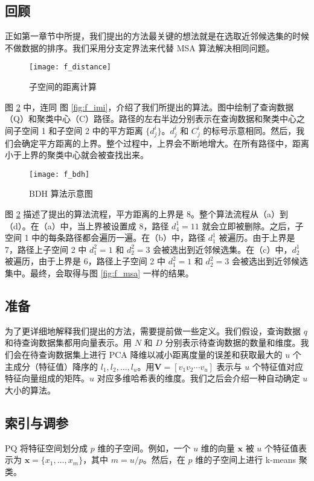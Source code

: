 \subsection{回顾}
正如第一章节中所提，我们提出的方法最关键的想法就是在选取近邻候选集的时候不做数据的排序。我们采用分支定界法来代替 MSA 算法解决相同问题。
\begin{figure}[H]
  \centering
  \texttt{[image: f\_distance]}
  \caption{子空间的距离计算}
  \label{fig:f_distance}
\end{figure}
图 \ref{fig:f_bdh} 中，连同 图 \ref{fig:f_imi}，介绍了我们所提出的算法。图中绘制了查询数据（Q）和聚类中心（C）路径。路径的左右半边分别表示在查询数据和聚类中心之间子空间 1 和子空间 2 中的平方距离 $\{d^i_j\}$。$d^i_j$ 和 $C^i_j$ 的标号示意相同。然后，我们会确定平方距离的上界。整个过程中，上界会不断地增大。在所有路径中，距离小于上界的聚类中心就会被查找出来。
\begin{figure}[H]
  \centering
  \texttt{[image: f\_bdh]}
  \caption{BDH 算法示意图}
  \label{fig:f_bdh}
\end{figure}
图 \ref{fig:f_bdh} 描述了提出的算法流程，平方距离的上界是 8。整个算法流程从（a）到（d）。在（a）中，当上界被设置成 8，路径 $d^1_4 =11$ 就会立即被删除。之后，子空间 1 中的每条路径都会遍历一遍。在（b）中，路径 $d^1_1$ 被遍历。由于上界是 7，路径上子空间 2 中 $d^2_1 =1$ 和 $d_2^2=3$ 会被选出到近邻候选集。在（c）中，$d^1_2$ 被遍历，由于上界是 6，路径上子空间 2 中 $d^2_1 =1$ 和 $d_2^2=3$ 会被选出到近邻候选集中。最终，会取得与图 \ref{fig:f_msa} 一样的结果。
\subsection{准备}
为了更详细地解释我们提出的方法，需要提前做一些定义。我们假设，查询数据 $q$ 和待查询数据集都用向量表示。用 $N$ 和 $D$ 分别表示待查询数据的数量和维度。我们会在待查询数据集上进行 PCA 降维以减小距离度量的误差和获取最大的 $u$ 个主成分（特征值）降序的 $l_1,l_2,\ldots,l_u$。用$\mathbf{V}=[v_1 v_2 \cdots v_u]$ 表示与 $u$ 个特征值对应特征向量组成的矩阵。$u$ 对应多维哈希表的维度。我们之后会介绍一种自动确定 $u$ 大小的算法。
\subsection{索引与调参}
PQ 将特征空间划分成 $p$ 维的子空间。例如，一个 $u$ 维的向量 $\mathbf{x}$ 被 $u$ 个特征值表示为 $\mathbf{x} = \{x_1,\ldots,x_m\}$，其中 $m = u/p$。然后，在 $p$ 维的子空间上进行 k-means 聚类。


